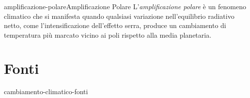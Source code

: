 \documentclass[preview]{standalone}
\begin{document}
\begin{snippetdefinition}{amplificazione-polare}{Amplificazione Polare}
    L'\textit{amplificazione polare} è un fenomeno climatico che si manifesta quando
    qualsiasi variazione nell'equilibrio radiativo netto,
    come l'intensificazione dell'effetto serra,
    produce un cambiamento di temperatura più marcato vicino ai poli rispetto alla media planetaria.
\end{snippetdefinition}


\section{Fonti}

\nocite{*} %

\begin{snippet}{cambiamento-climatico-fonti}
\printbibliography[heading=none]
\end{snippet}
\end{document}
